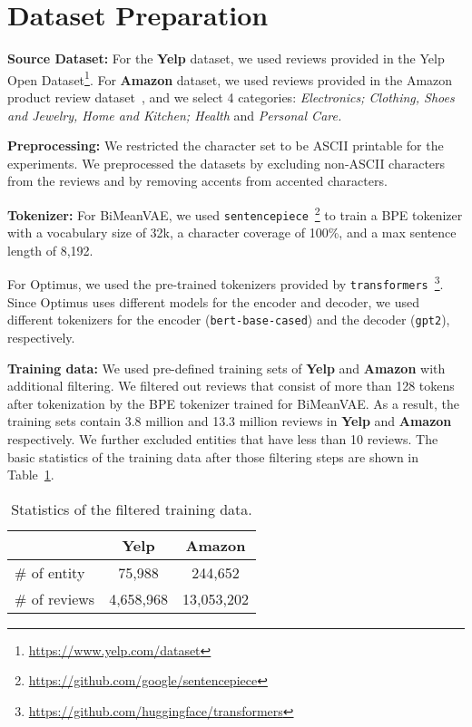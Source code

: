 \documentclass[11pt]{article}
\newcommand{\name}{\mbox{\sc BiMeanVAE}}
\newcommand{\yelp}{\mbox{\bf Yelp}}
\newcommand{\amazon}{\mbox{\bf Amazon}}
\begin{document}



\clearpage
\appendix
\section{Dataset Preparation}\label{app:dataset}

\noindent
{\bf Source Dataset:} 
For the \yelp{} dataset, we used reviews provided in the Yelp Open Dataset\footnote{\url{https://www.yelp.com/dataset}}.
For \amazon{} dataset, we used reviews provided in the Amazon product review dataset~\cite{he2016ups}, and we select 4 categories: \textit{Electronics; Clothing, Shoes and Jewelry, Home and Kitchen; Health} and \textit{Personal Care.}

\noindent
{\bf Preprocessing:} We restricted the character set to be ASCII printable for the experiments. We preprocessed the datasets by excluding non-ASCII characters from the reviews and by removing accents from accented characters.

\noindent
{\bf Tokenizer:} 
For \name{}, we used \texttt{sentencepiece}~\cite{kudo-richardson-2018-sentencepiece}\footnote{
\url{https://github.com/google/sentencepiece}} to train a BPE tokenizer with a vocabulary size of 32k, a character coverage of 100\%, and a max sentence length of 8,192.

For Optimus, we used the pre-trained tokenizers provided by \texttt{transformers}~\cite{wolf-etal-2020-transformers}\footnote{\url{https://github.com/huggingface/transformers}}.
Since Optimus uses different models for the encoder and decoder, we used different tokenizers for the encoder ({\tt bert-base-cased}) and the decoder ({\tt gpt2}), respectively.

\noindent
{\bf Training data:} We used pre-defined training sets of \yelp{} and \amazon{} with additional filtering. We filtered out reviews that consist of more than 128 tokens after tokenization by the BPE tokenizer trained for \name. 
As a result, the training sets contain 3.8 million and 13.3 million reviews in \yelp{} and \amazon{} respectively.
We further excluded entities that have less than 10 reviews.
The basic statistics of the training data after those filtering steps are shown in Table~\ref{tab:train_set_stats}.

\begin{table}[ht]
\small
    \centering
    \begin{tabular}{lcc}
    \toprule
         & \yelp & \amazon \\\midrule
\# of entity & 75,988 & 244,652 \\
\# of reviews & 4,658,968 & 13,053,202 \\
\bottomrule
    \end{tabular}
    \caption{Statistics of the filtered training data.}
    \label{tab:train_set_stats}
\end{table}
\end{document}
